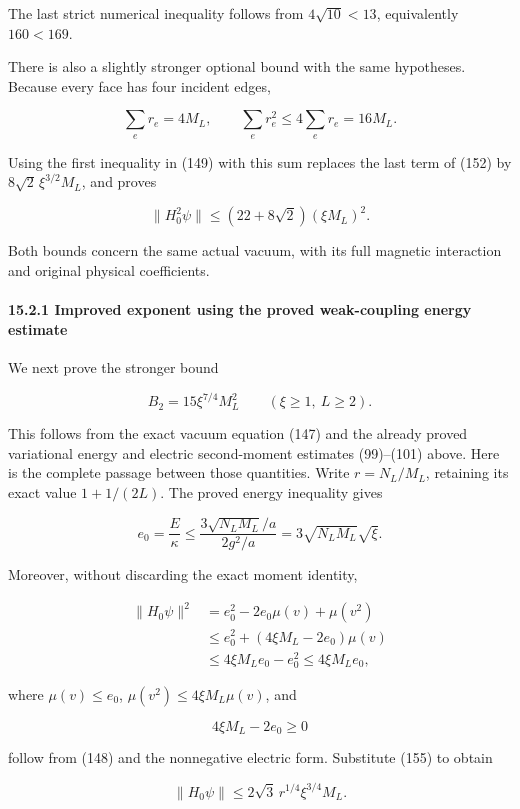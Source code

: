 \documentclass[
  11pt,
]{article}
\begin{document}
The last strict numerical inequality follows from \(4\sqrt{10}<13\),
equivalently \(160<169\).

There is also a slightly stronger optional bound with the same
hypotheses. Because every face has four incident edges,

\[
 \sum_er_e=4M_L,\qquad \sum_er_e^2\le4\sum_er_e=16M_L.
\]

Using the first inequality in (149) with this sum replaces the last term
of (152) by \(8\sqrt2\,\xi^{3/2}M_L\), and proves

\[
 \|H_0^2\psi\|\le(22+8\sqrt2)(\xi M_L)^2.
\tag{154}
\]

Both bounds concern the same actual vacuum, with its full magnetic
interaction and original physical coefficients.

\paragraph{15.2.1 Improved exponent using the proved weak-coupling
energy
estimate}\label{improved-exponent-using-the-proved-weak-coupling-energy-estimate}

We next prove the stronger bound

\[
 B_2=15\xi^{7/4}M_L^2\qquad(\xi\ge1,\ L\ge2).
\]

This follows from the exact vacuum equation (147) and the already proved
variational energy and electric second-moment estimates (99)--(101)
above. Here is the complete passage between those quantities. Write
\(r=N_L/M_L\), retaining its exact value \(1+1/(2L)\). The proved energy
inequality gives

\[
 e_0=\frac E\kappa
 \le\frac{3\sqrt{N_LM_L}/a}{2g^2/a}
 =3\sqrt{N_LM_L}\sqrt\xi.
\tag{155}
\]

Moreover, without discarding the exact moment identity,

\[
 \begin{aligned}
 \|H_0\psi\|^2
 &=e_0^2-2e_0\mu(v)+\mu(v^2)\\
 &\le e_0^2+(4\xi M_L-2e_0)\mu(v)\\
 &\le4\xi M_Le_0-e_0^2
 \le4\xi M_Le_0,
 \end{aligned}
\]

where \(\mu(v)\le e_0\), \(\mu(v^2)\le4\xi M_L\mu(v)\), and

\[
 4\xi M_L-2e_0\ge0
\]

follow from (148) and the nonnegative electric form. Substitute (155) to
obtain

\[
 \|H_0\psi\|\le2\sqrt3\,r^{1/4}\xi^{3/4}M_L.
\tag{156}
\]
\end{document}
